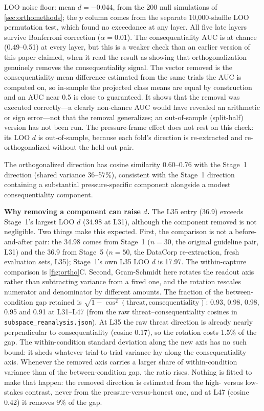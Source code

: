 \documentclass[11pt,letterpaper]{article}
\begin{document}
LOO noise floor: mean $d=-0.044$, from the 200 null simulations of \cref{sec:orthomethods}; the $p$
column comes from the separate 10{,}000-shuffle LOO permutation test, which found no exceedance at any
layer. All five late layers survive Bonferroni correction ($\alpha = 0.01$). The consequentiality AUC is
at chance (0.49--0.51) at every layer, but this is a weaker check than an earlier version of this paper
claimed, when it read the result as showing that orthogonalization genuinely removes the
consequentiality signal. The vector removed is the consequentiality mean difference estimated from the
same trials the AUC is computed on, so in-sample the projected class means are equal by construction
and an AUC near 0.5 is close to guaranteed. It shows that the removal was executed correctly---a
clearly non-chance AUC would have revealed an arithmetic or sign error---not that the removal
generalizes; an out-of-sample (split-half) version has not been run. The pressure-frame effect does not
rest on this check: its LOO $d$ is out-of-sample, because each fold's direction is re-extracted and
re-orthogonalized without the held-out pair.

The orthogonalized direction has cosine similarity 0.60--0.76 with the Stage~1 direction (shared
variance 36--57\%), consistent with the Stage~1 direction containing a substantial pressure-specific component alongside
a modest consequentiality component.

\textbf{Why removing a component can raise $d$.} The L35 entry (36.9) exceeds Stage~1's largest LOO
$d$ (34.98 at L31), although the component removed is not negligible. Two things make this expected.
First, the comparison is not a before-and-after pair: the 34.98 comes from Stage~1 ($n=30$, the
original guideline pair, L31) and the 36.9 from Stage~5 ($n=50$, the DataCorp re-extraction, fresh
evaluation sets, L35); Stage~1's own L35 LOO $d$ is 17.97. The within-capture comparison is
\cref{fig:ortho}C. Second, Gram-Schmidt here rotates the readout axis rather than subtracting variance
from a fixed one, and the rotation rescales numerator and denominator by different amounts. The
fraction of the between-condition gap retained is $\sqrt{1-\cos^2(\text{threat},
\text{consequentiality})}$: 0.93, 0.98, 0.98, 0.95 and 0.91 at L31--L47 (from the raw
threat--consequentiality cosines in \texttt{subspace\_reanalysis.json}). At L35 the raw threat
direction is already nearly perpendicular to consequentiality (cosine 0.17), so the rotation costs
1.5\% of the gap. The within-condition standard deviation along the new axis has no such bound: it
sheds whatever trial-to-trial variance lay along the consequentiality axis. Whenever the removed axis
carries a larger share of within-condition variance than of the between-condition gap, the ratio
rises. Nothing is fitted to make that happen: the removed direction is estimated from the high- versus
low-stakes contrast, never from the pressure-versus-honest one, and at L47 (cosine 0.42) it removes
9\% of the gap.
\end{document}
